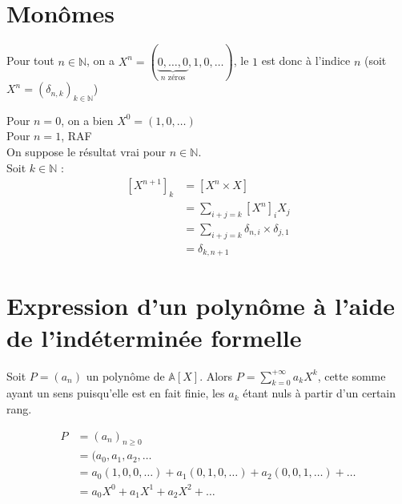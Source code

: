 \documentclass[../main.tex]{subfiles}
\begin{document}
\setcounter{section}{10}
\section{Monômes}

\begin{tcolorbox}[title=Propostion 13.11, title filled=false, colframe=lightblue, colback=lightblue!10!white]
    Pour tout $n \in \mathbb{N}$, on a $X^n = (\underbrace{0, \ldots, 0}_{\text{$n$ zéros}}, 1, 0, \ldots)$, le $1$ est donc à l'indice $n$ (soit $X^n = (\delta_{n,k})_{k\in \mathbb{N}}$)
\end{tcolorbox}

Pour $n = 0$, on a bien $X^0 = (1, 0, \ldots)$ \\
Pour $n = 1$, RAF \\
On suppose le résultat vrai pour $n \in \mathbb{N}$. \\
Soit $k \in \mathbb{N}$ : 
\begin{align*}
    \left[ X^{n+1} \right]_k &= \left[ X^n \times X \right] \\
    &= \sum_{i+j=k} \left[ X^n \right]_i X_j \\
    &= \sum_{i+j=k} \delta_{n,i} \times \delta_{j,1} \\
    &= \delta_{k, n+1}
\end{align*}

\section{Expression d'un polynôme à l'aide de l'indéterminée formelle}

\begin{tcolorbox}[title=Corollaire 13.12, title filled=false, colframe=orange, colback=orange!10!white]
    Soit $P = (a_n)$ un polynôme de $\mathbb{A}[X]$. Alors $P = \sum\limits_{k=0}^{+\infty} a_kX^k$, cette somme ayant un sens puisqu'elle est en fait finie, les $a_k$ étant nuls à partir d'un certain rang. 
\end{tcolorbox}

\begin{align*}
    P &= (a_n)_{n \geq 0} \\
    &= (a_0, a_1, a_2, \ldots \\
    &= a_0 (1, 0, 0,\ldots) + a_1(0, 1, 0, \ldots) +a_2(0, 0, 1, \ldots) + \ldots \\
    &= a_0X^0 + a_1X^1 + a_2X^2 + \ldots
\end{align*}

\setcounter{section}{25}
\end{document}
